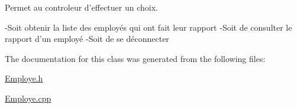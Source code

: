 \-Permet au controleur d'effectuer un choix. 

-\/\-Soit obtenir la liste des employés qui ont fait leur rapport -\/\-Soit de consulter le rapport d'un employé -\/\-Soit de se déconnecter 

\-The documentation for this class was generated from the following files\-:\begin{DoxyCompactItemize}
\item 
\hyperlink{_employe_8h}{\-Employe.\-h}\item 
\hyperlink{_employe_8cpp}{\-Employe.\-cpp}\end{DoxyCompactItemize}

